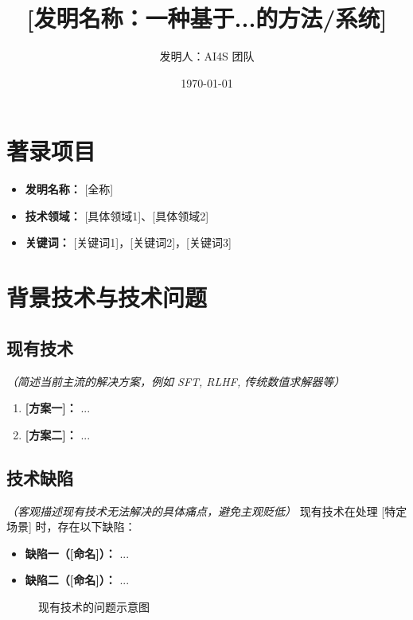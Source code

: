 \documentclass[a4paper,12pt]{article}
\title{\textbf{[发明名称：一种基于...的方法/系统]}}
\author{发明人：AI4S 团队}
\date{\today}
\begin{document}
\maketitle

\section{著录项目}
\begin{itemize}
    \item \textbf{发明名称：} [全称]
    \item \textbf{技术领域：} [具体领域1]、[具体领域2]
    \item \textbf{关键词：} [关键词1]，[关键词2]，[关键词3]
\end{itemize}

\section{背景技术与技术问题}

\subsection{现有技术}
\textit{（简述当前主流的解决方案，例如 SFT, RLHF, 传统数值求解器等）}
\begin{enumerate}
    \item \textbf{[方案一]：} ...
    \item \textbf{[方案二]：} ...
\end{enumerate}

\subsection{技术缺陷}
\textit{（客观描述现有技术无法解决的具体痛点，避免主观贬低）}
现有技术在处理 [特定场景] 时，存在以下缺陷：
\begin{itemize}
    \item \textbf{缺陷一（[命名]）：} ...
    \item \textbf{缺陷二（[命名]）：} ...
\end{itemize}

\begin{figure}[H]
    \centering
    \caption{现有技术的问题示意图}
    \label{fig:problem}
\end{figure}
\end{document}
